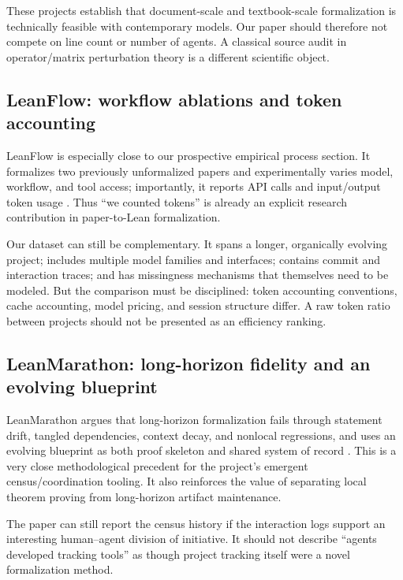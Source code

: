 \documentclass[11pt]{article}
\begin{document}
These projects establish that document-scale and textbook-scale formalization is
technically feasible with contemporary models.  Our paper should therefore not
compete on line count or number of agents.  A classical source audit in
operator/matrix perturbation theory is a different scientific object.

\subsection{LeanFlow: workflow ablations and token accounting}

LeanFlow is especially close to our prospective empirical process section.  It
formalizes two previously unformalized papers and experimentally varies model,
workflow, and tool access; importantly, it reports API calls and input/output
token usage \citep{milikic2026leanflow}.  Thus ``we counted tokens'' is already
an explicit research contribution in paper-to-Lean formalization.

Our dataset can still be complementary.  It spans a longer, organically evolving
project; includes multiple model families and interfaces; contains commit and
interaction traces; and has missingness mechanisms that themselves need to be
modeled.  But the comparison must be disciplined: token accounting conventions,
cache accounting, model pricing, and session structure differ.  A raw token
ratio between projects should not be presented as an efficiency ranking.

\subsection{LeanMarathon: long-horizon fidelity and an evolving blueprint}

LeanMarathon argues that long-horizon formalization fails through statement
drift, tangled dependencies, context decay, and nonlocal regressions, and uses
an evolving blueprint as both proof skeleton and shared system of record
\citep{zhang2026leanmarathon}.  This is a very close methodological precedent
for the project's emergent census/coordination tooling.  It also reinforces the
value of separating local theorem proving from long-horizon artifact
maintenance.

The paper can still report the census history if the interaction logs support an
interesting human--agent division of initiative.  It should not describe
``agents developed tracking tools'' as though project tracking itself were a
novel formalization method.
\end{document}
